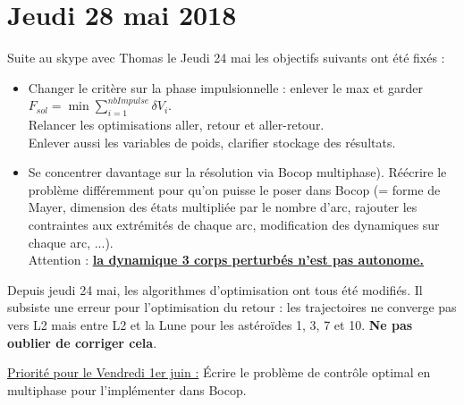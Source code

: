 \documentclass[fleqn,%
a4paper,11pt]{scrbook}
\begin{document}
\section*{Jeudi 28 mai 2018}
	Suite au skype avec Thomas le Jeudi 24 mai les objectifs suivants ont 		été fixés :
	\begin{itemize}
		\item Changer le critère sur la phase impulsionnelle : enlever le 	max et garder $F_{sol} = \min \sum_{i=1}^{nbImpulse} \delta V_i$. \\
		Relancer les optimisations aller, retour et aller-retour. \\
		Enlever aussi les variables de poids, clarifier stockage des résultats.
		
		\item Se concentrer davantage sur la résolution via Bocop multiphase).
		Réécrire le problème différemment pour qu'on puisse le poser dans Bocop (= forme de Mayer, dimension des 	états multipliée par le nombre d'arc, rajouter les contraintes 	aux extrémités de chaque arc, modification des dynamiques sur chaque arc, ...). \\
		Attention : \underline{\textbf{la dynamique 3 corps perturbés n'est pas autonome.}}
	\end{itemize}
	
	Depuis jeudi 24 mai, les algorithmes d'optimisation ont tous été modifiés. Il subsiste une erreur pour l'optimisation du retour : les trajectoires ne converge pas vers L2 mais entre L2 et la Lune pour les astéroïdes 1, 3, 7 et 10. \textbf{Ne pas oublier de corriger cela}.
	
	\underline{Priorité pour le Vendredi 1er juin :} Écrire le problème de contrôle optimal en multiphase pour l'implémenter dans Bocop.
	
\end{document}

